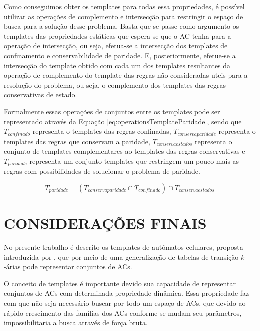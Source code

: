\documentclass[12pt,a4paper]{article}
\let\stdsection\section
\renewcommand\section{\newpage\stdsection}
\begin{document}
	Como conseguimos obter os templates para todas essa propriedades, é possível utilizar as operações de complemento e intersecção para restringir o espaço de busca para a solução desse problema. Basta que se passe como argumento os templates das propriedades estáticas que espera-se que o AC tenha para a operação de intersecção, ou seja, efetua-se a intersecção dos templates de confinamento e conservabilidade de paridade. E, posteriormente, efetue-se a intersecção do template obtido com cada um dos templates resultantes da operação de complemento do template das regras não consideradas uteis para a resolução do problema, ou seja, o complemento dos templates das regras conservativas de estado.

	Formalmente essas operações de conjuntos entre os templates pode ser representado através da Equação \ref{eq:operationsTemplateParidade}, sendo que $T_{confinado}$ representa o templates das regras confinadas, $T_{conservaparidade}$ representa o templates das regras que conservam a paridade, $\bar{T}_{conservaestados}$ representa o conjunto de templates complementares ao templates das regras conservativas e $T_{paridade}$ representa um conjunto templates que restringem um pouco mais as regras com possibilidades de solucionar o problema de paridade.

	\begin{equation}
	T_{paridade} = (T_{conservaparidade} \cap T_{confinado}) \cap \bar{T}_{conservaestados}
	\label{eq:operationsTemplateParidade}
	\end{equation}





\section{CONSIDERAÇÕES FINAIS}\label{sec:conclusao}%
No presente trabalho é descrito os templates de autômatos celulares, proposta introduzida por , que por meio de uma generalização de tabelas de transição $k$-árias pode representar conjuntos de ACs.

O conceito de templates é importante devido sua capacidade de representar conjuntos de ACs com determinada propriedade dinâmica. Essa propriedade faz com que não seja necessário buscar por todo um espaço de ACs, que devido ao rápido crescimento das famílias dos ACs conforme se mudam seu parâmetros, impossibilitaria a busca através de força bruta.
\end{document}
